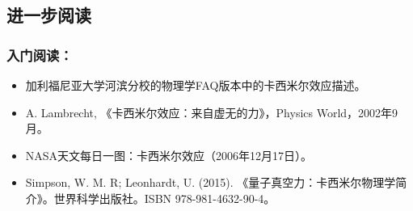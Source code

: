 \subsection{进一步阅读}
\subsubsection{入门阅读：}
\begin{itemize}
\item 加利福尼亚大学河滨分校的物理学FAQ版本中的卡西米尔效应描述。
\item A. Lambrecht, 《卡西米尔效应：来自虚无的力》，Physics World，2002年9月。
\item NASA天文每日一图：卡西米尔效应（2006年12月17日）。
\item Simpson, W. M. R; Leonhardt, U. (2015). 《量子真空力：卡西米尔物理学简介》。世界科学出版社。ISBN 978-981-4632-90-4。
\end{itemize}
